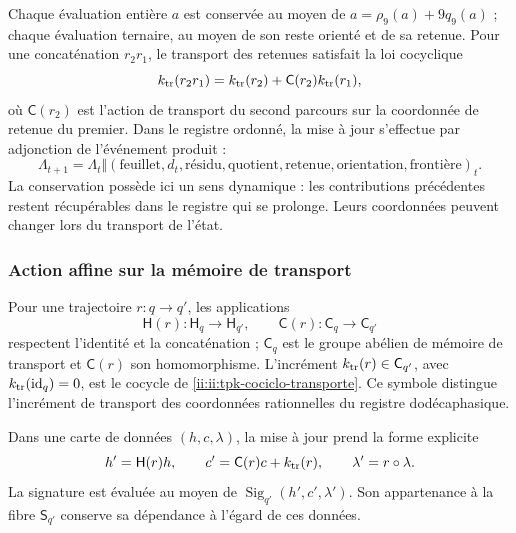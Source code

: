 Chaque évaluation entière \(a\) est conservée au moyen de \(a=\rho_9(a)+9q_9(a)\) ; chaque évaluation ternaire, au moyen de son reste orienté et de sa retenue. Pour une concaténation \(r_2r_1\), le transport des retenues satisfait la loi cocyclique
\begin{equation}
 k_{\rm tr}(r_2r_1)
 =k_{\rm tr}(r_2)+\mathsf C(r_2)k_{\rm tr}(r_1),
 \label{ii:ii:tpk-cociclo-transporte}
\end{equation}
où \(\mathsf C(r_2)\) est l'action de transport du second parcours sur la coordonnée de retenue du premier. Dans le registre ordonné, la mise à jour s'effectue par adjonction de l'événement produit :
\[
 \Lambda_{t+1}=\Lambda_t\Vert
 (\text{feuillet},d_t,\text{résidu},\text{quotient},
   \text{retenue},\text{orientation},\text{frontière})_t.
\]
La conservation possède ici un sens dynamique : les contributions précédentes restent récupérables dans le registre qui se prolonge. Leurs coordonnées peuvent changer lors du transport de l'état.

\subsubsection{Action affine sur la mémoire de transport}

Pour une trajectoire \(r:q\to q'\), les applications
\[
 \mathsf H(r):\mathsf H_q\to\mathsf H_{q'},\qquad
 \mathsf C(r):\mathsf C_q\to\mathsf C_{q'}
\]
respectent l'identité et la concaténation ; \(\mathsf C_q\) est le groupe abélien de mémoire de transport et \(\mathsf C(r)\) son homomorphisme. L'incrément \(k_{\rm tr}(r)\in\mathsf C_{q'}\), avec \(k_{\rm tr}(\operatorname{id}_q)=0\), est le cocycle de \eqref{ii:ii:tpk-cociclo-transporte}. Ce symbole distingue l'incrément de transport des coordonnées rationnelles du registre dodécaphasique.

Dans une carte de données \((h,c,\lambda)\), la mise à jour prend la forme explicite
\begin{equation}
 h'=\mathsf H(r)h,\qquad
 c'=\mathsf C(r)c+k_{\rm tr}(r),\qquad
 \lambda'=r\circ\lambda.
 \label{ii:ii:tpk-accion-afin}
\end{equation}
La signature est évaluée au moyen de \(\operatorname{Sig}_{q'}(h',c',\lambda')\). Son appartenance à la fibre \(\mathsf S_{q'}\) conserve sa dépendance à l'égard de ces données.

